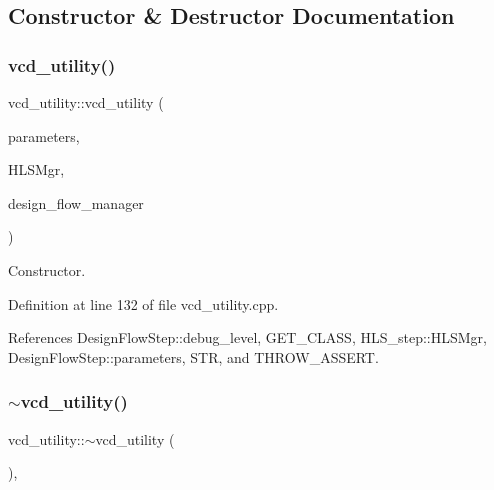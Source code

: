 \subsection{Constructor \& Destructor Documentation}
\mbox{\label{classvcd__utility_adaefaed1f7e4eedee23f00b0ab5b47ab}} 
\subsubsection{\texorpdfstring{vcd\+\_\+utility()}{vcd\_utility()}}
{\footnotesize\ttfamily vcd\+\_\+utility\+::vcd\+\_\+utility (\begin{DoxyParamCaption}\item[{const \hyperlink{Parameter_8hpp_a37841774a6fcb479b597fdf8955eb4ea}{Parameter\+Const\+Ref}}]{parameters,  }\item[{const \hyperlink{hls__manager_8hpp_acd3842b8589fe52c08fc0b2fcc813bfe}{H\+L\+S\+\_\+manager\+Ref}}]{H\+L\+S\+Mgr,  }\item[{const Design\+Flow\+Manager\+Const\+Ref}]{design\+\_\+flow\+\_\+manager }\end{DoxyParamCaption})}



Constructor. 



Definition at line 132 of file vcd\+\_\+utility.\+cpp.



References Design\+Flow\+Step\+::debug\+\_\+level, G\+E\+T\+\_\+\+C\+L\+A\+SS, H\+L\+S\+\_\+step\+::\+H\+L\+S\+Mgr, Design\+Flow\+Step\+::parameters, S\+TR, and T\+H\+R\+O\+W\+\_\+\+A\+S\+S\+E\+RT.

\mbox{\label{classvcd__utility_a54d787cb05326b8732ba706a68c05023}} 
\subsubsection{\texorpdfstring{$\sim$vcd\+\_\+utility()}{~vcd\_utility()}}
{\footnotesize\ttfamily vcd\+\_\+utility\+::$\sim$vcd\+\_\+utility (\begin{DoxyParamCaption}{ }\end{DoxyParamCaption})\hspace{0.3cm}{\ttfamily [override]}, {\ttfamily [default]}}



